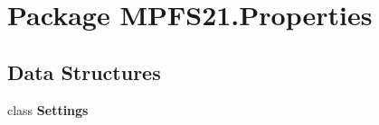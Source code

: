 \hypertarget{namespace_m_p_f_s21_1_1_properties}{}\section{Package M\+P\+F\+S21.\+Properties}
\label{namespace_m_p_f_s21_1_1_properties}
\subsection*{Data Structures}
\begin{DoxyCompactItemize}
\item 
class {\bfseries Settings}
\end{DoxyCompactItemize}
